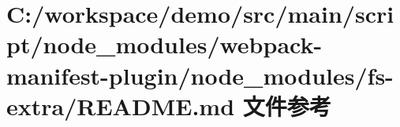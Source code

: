 \hypertarget{node__modules_2webpack-manifest-plugin_2node__modules_2fs-extra_2_r_e_a_d_m_e_8md}{}\section{C\+:/workspace/demo/src/main/script/node\+\_\+modules/webpack-\/manifest-\/plugin/node\+\_\+modules/fs-\/extra/\+R\+E\+A\+D\+ME.md 文件参考}
\label{node__modules_2webpack-manifest-plugin_2node__modules_2fs-extra_2_r_e_a_d_m_e_8md}
